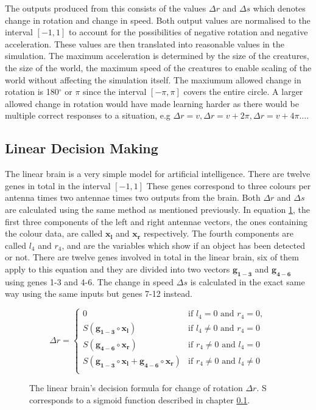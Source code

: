 \documentclass[a4paper,11pt]{kth-mag}
\begin{document}
The outputs produced from this consists of the values $\Delta r$ and $\Delta s$ which denotes change in rotation and change in speed. Both output values are normalised to the interval $[-1,1]$ to account for the possibilities of negative rotation and negative acceleration. These values are then translated into reasonable values in the simulation. The maximum acceleration is determined by the size of the creatures, the size of the world, the maximum speed of the creatures to enable scaling of the world without affecting the simulation itself. The maxiumum allowed change in rotation is 180$^\circ$ or $\pi$ since the interval $[-\pi,\pi]$ covers the entire circle. A larger allowed change in rotation would have made learning harder as there would be multiple correct responses to a situation, e.g $\Delta r = v, \Delta r = v+ 2\pi, \Delta r = v+ 4\pi \dots $.

\subsection{Linear Decision Making}
\label{linear-decision-making}
The linear brain is a very simple model for artificial intelligence. There are twelve genes in total in the interval $[-1,1]$ These genes correspond to three colours per antenna times two antennae times two outputs from the brain. Both $\Delta r$ and $\Delta s$ are calculated using the same method as mentioned previously.
In equation \ref{linear-decide}, the first three components of the left and right antennae vectors, the ones containing the colour data, are called $\mathbf{x_{l}}$ and $\mathbf{x_{r}}$ respectively. The fourth components are called $l_4$ and $r_4$, and are the variables which show if an object has been detected or not. There are twelve genes involved in total in the linear brain, six of them apply to this equation and they are divided into two vectors $\mathbf{g_{1-3}}$ and $\mathbf{g_{4-6}}$ using genes 1-3 and 4-6. The change in speed $\Delta s$ is calculated in the exact same way using the same inputs but genes 7-12 instead.

\begin{figure}
\begin{equation}
\Delta r =
\begin{cases}
	0 																				& \text{if $l_4 = 0$ and $r_4 = 0$},\\
	S(\mathbf{g_{1-3}} \circ \mathbf{x_l}) 											& \text{if $l_4 \neq 0$ and $r_4 = 0$}\\
	S(\mathbf{g_{4-6}} \circ \mathbf{x_r}) 											& \text{if $r_4 \neq 0$ and $l_4 = 0$}\\
	S(\mathbf{g_{1-3}} \circ \mathbf{x_l} + \mathbf{g_{4-6}} \circ \mathbf{x_r} ) 	& \text{if $r_4 \neq 0$ and $l_4 \neq 0$}\\
\end{cases}	
\end{equation}
\caption{The linear brain's decision formula for change of rotation $\Delta r$. S corresponds to a sigmoid function described in chapter \ref{linear-decision-making}.}
\label{linear-decide}
\end{figure}
\end{document}
